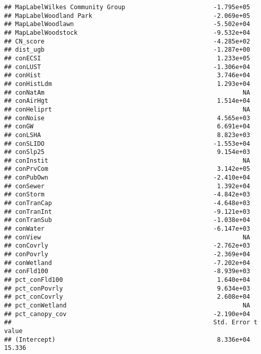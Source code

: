 \documentclass[]{article}
\begin{document}
\begin{verbatim}
## MapLabelWilkes Community Group                        -1.795e+05
## MapLabelWoodland Park                                 -2.069e+05
## MapLabelWoodlawn                                      -5.502e+04
## MapLabelWoodstock                                     -9.532e+04
## CN_score                                              -4.285e+02
## dist_ugb                                              -1.287e+00
## conECSI                                                1.233e+05
## conLUST                                               -1.306e+04
## conHist                                                3.746e+04
## conHistLdm                                             1.293e+04
## conNatAm                                                      NA
## conAirHgt                                              1.514e+04
## conHeliprt                                                    NA
## conNoise                                               4.565e+03
## conGW                                                  6.691e+04
## conLSHA                                                8.823e+03
## conSLIDO                                              -1.553e+04
## conSlp25                                               9.154e+03
## conInstit                                                     NA
## conPrvCom                                              3.142e+05
## conPubOwn                                             -2.410e+04
## conSewer                                               1.392e+04
## conStorm                                              -4.842e+03
## conTranCap                                            -4.648e+03
## conTranInt                                            -9.121e+03
## conTranSub                                            -1.038e+04
## conWater                                              -6.147e+03
## conView                                                       NA
## conCovrly                                             -2.762e+03
## conPovrly                                             -2.369e+04
## conWetland                                            -7.202e+04
## conFld100                                             -8.939e+03
## pct_conFld100                                          1.640e+04
## pct_conPovrly                                          9.634e+03
## pct_conCovrly                                          2.608e+04
## pct_conWetland                                                NA
## pct_canopy_cov                                        -2.190e+04
##                                                       Std. Error t value
## (Intercept)                                            8.336e+04  15.336

\end{verbatim}
\end{document}
